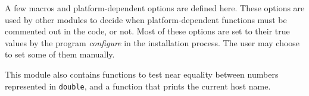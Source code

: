 
A few macros and platform-dependent options are defined here.
These options are used by other modules to decide when 
platform-dependent functions must be commented out in the code, or not.
Most of these options are set to their true values by the program
{\it configure} in the installation process. The user may choose
to set some of them manually.
\iffalse
Each option must either be left undefined (i.e., the corresponding
macro is put to false, using ``\texttt{\#undef}) 
or can be given its proper value (using ``\texttt{\#define} commands).
An option can be defined only under certain conditions.
For example, \texttt{USE\_GMP} can be defined only if GMP
is available, \texttt{HAVE\_ERF} can be defined only if the Unix \texttt{erf}
function is available, and so on.
\fi
This module also contains functions to test near equality between numbers represented in 
\texttt{double}, and a function that prints the current host name.

